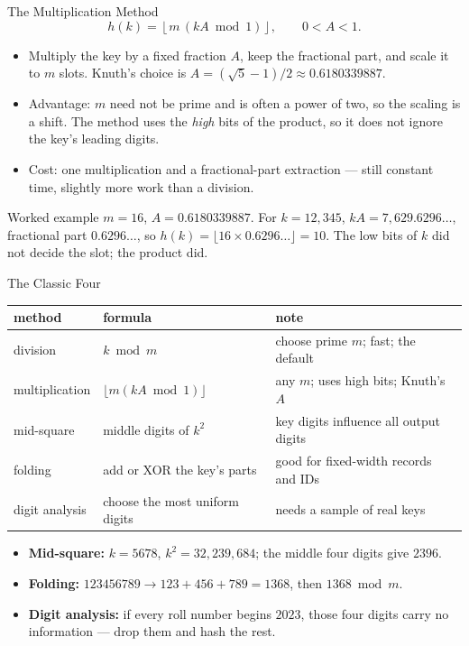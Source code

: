 \documentclass[aspectratio=169]{beamer}
\begin{document}
\begin{frame}{The Multiplication Method}
  \[
    h(k) = \left\lfloor m\,(kA \bmod 1)\right\rfloor,
    \qquad 0 < A < 1.
  \]
  \begin{itemize}
    \item Multiply the key by a fixed fraction $A$, keep the fractional part,
      and scale it to $m$ slots. Knuth's choice is
      $A = (\sqrt{5}-1)/2 \approx 0.6180339887$.
    \item Advantage: $m$ need not be prime and is often a power of two, so the
      scaling is a shift. The method uses the \emph{high} bits of the product,
      so it does not ignore the key's leading digits.
    \item Cost: one multiplication and a fractional-part extraction --- still
      constant time, slightly more work than a division.
  \end{itemize}
  \begin{exampleblock}{Worked example}
    $m = 16$, $A = 0.6180339887$. For $k = 12{,}345$,
    $kA = 7{,}629.6296\ldots$, fractional part $0.6296\ldots$, so
    $h(k) = \lfloor 16 \times 0.6296\ldots\rfloor = 10$. The low bits of $k$
    did not decide the slot; the product did.
  \end{exampleblock}
\end{frame}

\begin{frame}{The Classic Four}
  \begin{center}
  {\footnotesize
  \begin{tabular}{l l p{5.4cm}}
    \toprule
    \textbf{method} & \textbf{formula} & \textbf{note} \\
    \midrule
    division & $k \bmod m$ & choose prime $m$; fast; the default \\
    multiplication & $\lfloor m(kA \bmod 1)\rfloor$ &
      any $m$; uses high bits; Knuth's $A$ \\
    mid-square & middle digits of $k^2$ &
      key digits influence all output digits \\
    folding & add or XOR the key's parts &
      good for fixed-width records and IDs \\
    digit analysis & choose the most uniform digits &
      needs a sample of real keys \\
    \bottomrule
  \end{tabular}}
  \end{center}
  \begin{itemize}
    \item \textbf{Mid-square:} $k = 5678$, $k^2 = 32{,}239{,}684$; the middle
      four digits give $2396$.
    \item \textbf{Folding:} $123456789 \to 123 + 456 + 789 = 1368$, then
      $1368 \bmod m$.
    \item \textbf{Digit analysis:} if every roll number begins $2023$, those
      four digits carry no information --- drop them and hash the rest.
  \end{itemize}
\end{frame}
\end{document}
